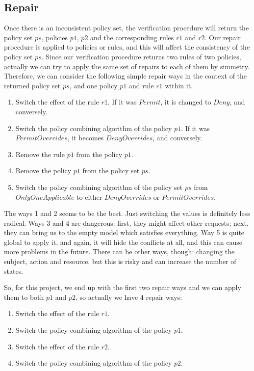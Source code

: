 \documentclass{acm_proc_article-sp}
\begin{document}
\subsection{Repair}

Once there is an inconsistent policy set, the verification procedure will return the policy set $ps$, policies $p1$, $p2$ and the corresponding rules $r1$ and $r2$. Our repair procedure is applied to policies or rules, and this will affect the consistency of the policy set $ps$. Since our verification procedure returns two rules of two policies, actually we can try to apply the same set of repairs to each of them by simmetry. Therefore, we can consider the following simple repair ways in the context of the returned policy set $ps$, and one policy $p1$ and rule $r1$ within it.

\begin{enumerate}
\item Switch the effect of the rule $r1$. If it was $Permit$, it is changed to $Deny$, and conversely.
\item Switch the policy combining algorithm of the policy $p1$. If it was $PermitOverrides$, it becomes $DenyOverrides$, and conversely.
\item Remove the rule $p1$ from the policy $p1$.
\item Remove the policy $p1$ from the policy set $ps$.
\item Switch the policy combining algorithm of the policy set $ps$ from $OnlyOneApplicable$ to either $DenyOverrides$ or $PermitOverrides$.
\end{enumerate}

The ways 1 and 2 seems to be the best. Just switching the values is definitely less radical. Ways 3 and 4 are dangerous: first, they might affect other requests; next, they can bring us to the empty model which satisfies everything. Way 5 is quite global to apply it, and again, it will hide the conflicts at all, and this can cause more problems in the future. There can be other ways, though: changing the subject, action and resource, but this is risky and can increase the number of states. 

So, for this project, we end up with the first two repair ways and we can apply them to both $p1$ and $p2$, so actually we have 4 repair ways:

\begin{enumerate}
\item Switch the effect of the rule $r1$.
\item Switch the policy combining algorithm of the policy $p1$.
\item Switch the effect of the rule $r2$.
\item Switch the policy combining algorithm of the policy $p2$.
\end{enumerate}
\end{document}
